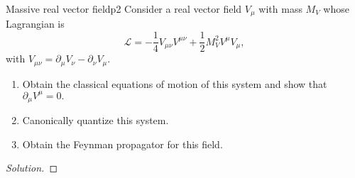 \begin{problem}{Massive real vector field}{p2}
   Consider a real vector field \(V_\mu\) with mass \(M_V\) whose Lagrangian is
   \begin{equation*}
      \mathcal{L} = - \frac14 V_{\mu \nu} V^{\mu\nu} + \frac12 M_V^2 V^\mu V_\mu,
   \end{equation*}
   with \(V_{\mu\nu} = \partial_\mu V_\nu - \partial_\nu V_\mu.\)
   \begin{enumerate}[label=(\alph*)]
       \item Obtain the classical equations of motion of this system and show that \(\partial_\mu V^\mu = 0.\)
       \item Canonically quantize this system.
       \item Obtain the Feynman propagator for this field.
   \end{enumerate}
\end{problem}
\begin{proof}[Solution]
    
\end{proof}
